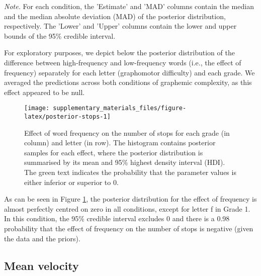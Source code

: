 \documentclass[
  11pt,
  english,
  ,doc,mask,floatsintext]{apa6}
\begin{document}
\begin{table}[htb]
\begin{center}
\begin{threeparttable}
{}

\begin{tablenotes}[para]
\normalsize{\textit{Note.} For each condition, the 'Estimate' and 'MAD' columns contain the
    median and the median absolute deviation (MAD) of the posterior distribution,
    respectively. The 'Lower' and 'Upper' columns contain the lower and upper
    bounds of the 95\% credible interval.}
\end{tablenotes}

\end{threeparttable}
\end{center}

\end{table}

For exploratory purposes, we depict below the posterior distribution of the difference between high-frequency and low-frequency words (i.e., the effect of frequency) separately for each letter (graphomotor difficulty) and each grade. We averaged the predictions across both conditions of graphemic complexity, as this effect appeared to be null.

\begin{figure}[!htb]

{\centering \texttt{[image: supplementary\_materials\_files/figure-latex/posterior-stops-1]} 

}

\caption{Effect of word frequency on the number of stops for each grade (in column) and letter (in row). The histogram contains posterior samples for each effect, where the posterior distribution is summarised by its mean and 95\% highest density interval (HDI). The green text indicates the probability that the parameter values is either inferior or superior to 0.}\label{fig:posterior-stops}
\end{figure}

As can be seen in Figure \ref{fig:posterior-stops}, the posterior distribution for the effect of frequency is almost perfectly centred on zero in all conditions, except for letter f in Grade 1. In this condition, the 95\% credible interval excludes 0 and there is a 0.98 probability that the effect of frequency on the number of stops is negative (given the data and the priors).

\hypertarget{mean-velocity}{%
\subsection{Mean velocity}\label{mean-velocity}}
\end{document}
